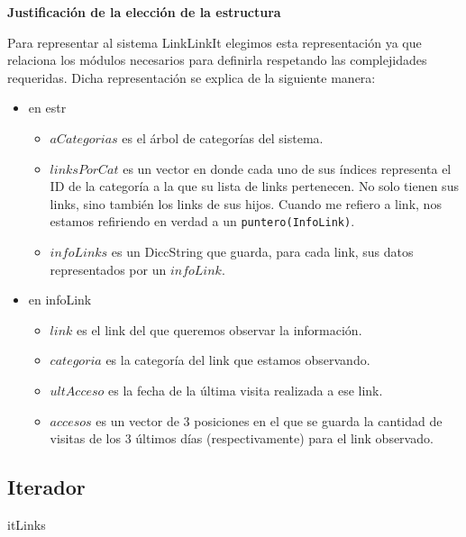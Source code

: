 \documentclass[10pt, a4paper]{article}
\let\TipoVariable=\texttt
\newcommand{\modTitulo}[1]{
  \vspace*{1ex}\par\noindent\textbf{\large #1}\par
}
\begin{document}
\modTitulo{Justificaci\'on de la elecci\'on de la estructura}
Para representar al sistema LinkLinkIt elegimos esta representaci\'on ya que relaciona los m\'odulos necesarios para definirla respetando las complejidades requeridas. Dicha representaci\'on se explica de la siguiente manera:

\begin{itemize}
  \item en estr
  \begin{itemize}
	\item $aCategorias$ es el \'arbol de categor\'ias del sistema.
	\item $linksPorCat$ es un vector en donde cada uno de sus \'indices representa el ID de la categor\'ia a la que su lista de links pertenecen. No solo tienen sus links, sino tambi\'en los links de sus hijos. Cuando me refiero a link, nos estamos refiriendo en verdad a un \TipoVariable{puntero(InfoLink)}.
	\item $infoLinks$ es un DiccString que guarda, para cada link, sus datos representados por un $infoLink$.
  \end{itemize}
  \item en infoLink
  \begin{itemize}
	\item $link$ es el link del que queremos observar la informaci\'on.
	\item $categoria$ es la categor\'ia del link que estamos observando.
	\item $ultAcceso$ es la fecha de la \'ultima visita realizada a ese link.
	\item $accesos$ es un vector de 3 posiciones en el que se guarda la cantidad de visitas de los 3 \'ultimos d\'ias (respectivamente) para el link observado.
  \end{itemize}
\end{itemize}

\subsection{Iterador}

\begin{Estructura}{itLinks}
	\begin{Tupla}
	\end{Tupla}
\end{Estructura}

\mbox{}
\end{document}
